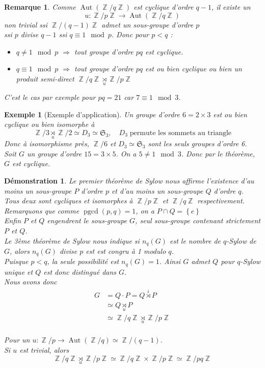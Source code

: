 \documentclass[a4paper, oneside]{report}
\theoremstyle{break}
\newtheorem{exemple}[thm]{Exemple}
\newtheorem{remarque}[thm]{Remarque}
\newtheorem*{demonstration}{Démonstration}
\newcommand{\x}{\times}
\DeclareMathOperator{\Z}{\mathbb{Z}}
\renewcommand{\S}{\mathfrak{S}}
\DeclarePairedDelimiter\ens{\left\{ }{\right\} }%
\DeclareMathOperator{\pgcd}{pgcd}
\DeclareMathOperator{\Aut}{Aut}
\renewcommand{\ens}[1]{\left\{ #1 \right\} }%
\newcommand{\us}{\underset}
\newcommand{\os}{\overset}
\begin{document}
\begin{remarque}
Comme $\Aut(\Z/q\Z)$ est cyclique d'ordre $q - 1$, il existe un 
\[
u : \Z/p\Z \rightarrow \Aut(\Z/q\Z)
\]
non trivial ssi $\Z/(q-1)\Z$ admet un sous-groupe d'ordre $p$\\
ssi $p$ divise $q - 1$ ssi $q \equiv 1 \mod p$. Donc pour $p<q$ :\\
\begin{itemize}
\item $q\neq 1 \mod p$ $\Rightarrow$ tout groupe d'ordre $pq$ est cyclique.
\item $q\equiv 1 \mod p$ $\Rightarrow$ tout groupe d'ordre $pq$ est ou bien cyclique ou bien un produit semi-direct $\Z/q\Z \us{u}{\rtimes} \Z/p\Z$
\end{itemize}
C'est le cas par exemple pour $pq = 21$ car $7 \equiv 1 \mod 3$.
\end{remarque}

\begin{exemple}[Exemple d'application]
Un groupe d'ordre $6 = 2 \times 3$ est ou bien cyclique ou bien isomorphe à
\[
\Z/3 \us{u}{\rtimes} \Z/2 \simeq D_3	\simeq \mathfrak{S}_3, \quad	D_3 \; \text{permute les sommets au triangle}
\]
Donc à isomorphisme près, $\Z/6$ et $D_3 \simeq \S_3$ sont les seuls groupes d'ordre 6.\\
Soit $G$ un groupe d'ordre $15=3\x 5$. On a $5\neq 1 \mod 3$. Donc par le théorème, $G$ est cyclique.
\end{exemple}

\begin{demonstration}
Le premier théorème de Sylow nous affirme l'existence d'au moins un sous-groupe $P$ d'ordre $p$ et d'au moins un sous-groupe $Q$ d'ordre $q$. Tous deux sont cycliques et isomorphes à $\Z/p\Z$ et $\Z/q\Z$ respectivement. Remarquons que comme $\pgcd(p,q) = 1$, on a $P \cap Q = \ens{e}$\\
Enfin $P$ et $Q$ engendrent le sous-groupe $G$, seul sous-groupe contenant strictement $P$ et $Q$.\\
Le 3ème théorème de Sylow nous indique si $n_q(G)$ est le nombre de $q$-Sylow de $G$, alors $n_q(G)$ divise $p$ est est congru à 1 modulo $q$.\\
Puisque $p < q$, la seule possibilité est $n_q(G) = 1$. Ainsi $G$ admet $Q$ pour $q$-Sylow unique et $Q$ est donc distingué dans $G$.\\
Nous avons donc
\begin{align*}
G &= Q \cdot P = Q \os{i}{\rtimes} P
\\
&\simeq Q \us{u}{\rtimes} P
\\
&\simeq \Z/q\Z \us{u}{\rtimes} \Z/p\Z
\end{align*}\\
Pour un $u : \Z/p \rightarrow \Aut (\Z/q) \simeq \Z/(q-1)$.\\
Si $u$ est trivial, alors
\[
\Z/q\Z \us{u}{\rtimes} \Z/p\Z \simeq \Z/q\Z \times \Z/p\Z \simeq \Z/pq\Z
\]
\end{demonstration}
\end{document}
